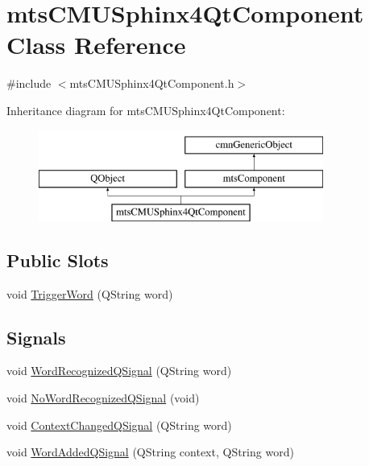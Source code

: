 \hypertarget{classmts_c_m_u_sphinx4_qt_component}{\section{mts\-C\-M\-U\-Sphinx4\-Qt\-Component Class Reference}
\label{classmts_c_m_u_sphinx4_qt_component}
}


{\ttfamily \#include $<$mts\-C\-M\-U\-Sphinx4\-Qt\-Component.\-h$>$}

Inheritance diagram for mts\-C\-M\-U\-Sphinx4\-Qt\-Component\-:\begin{figure}[H]
\begin{center}
\leavevmode
\includegraphics[height=3.000000cm]{d1/d5f/classmts_c_m_u_sphinx4_qt_component}
\end{center}
\end{figure}
\subsection*{Public Slots}
\begin{DoxyCompactItemize}
\item 
void \hyperlink{classmts_c_m_u_sphinx4_qt_component_aa42b7b827e6a6c895196bccdafb78834}{Trigger\-Word} (Q\-String word)
\end{DoxyCompactItemize}
\subsection*{Signals}
\begin{DoxyCompactItemize}
\item 
void \hyperlink{classmts_c_m_u_sphinx4_qt_component_a6dd54fb2791af2d253ac75a3a324611f}{Word\-Recognized\-Q\-Signal} (Q\-String word)
\item 
void \hyperlink{classmts_c_m_u_sphinx4_qt_component_abf21d043f3cfc4e590302f7e5ed714c1}{No\-Word\-Recognized\-Q\-Signal} (void)
\item 
void \hyperlink{classmts_c_m_u_sphinx4_qt_component_ac3eb74bab3378f711b830a155502a08f}{Context\-Changed\-Q\-Signal} (Q\-String word)
\item 
void \hyperlink{classmts_c_m_u_sphinx4_qt_component_a7765cc91c694b7a50d55ff1b9145cd12}{Word\-Added\-Q\-Signal} (Q\-String context, Q\-String word)
\end{DoxyCompactItemize}

